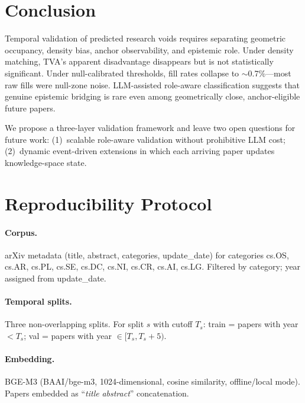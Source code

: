 \documentclass[11pt,twocolumn]{article}
\newcommand{\tva}{\textsf{TVA}}
\begin{document}
\section{Conclusion}

Temporal validation of predicted research voids requires separating geometric occupancy,
density bias, anchor observability, and epistemic role.
Under density matching, \tva{}'s apparent disadvantage disappears but is not
statistically significant. Under null-calibrated thresholds, fill rates collapse to
$\sim$0.7\%---most raw fills were null-zone noise.
LLM-assisted role-aware classification suggests that genuine epistemic bridging is rare even among
geometrically close, anchor-eligible future papers.

We propose a three-layer validation framework and leave two open questions for future
work: (1)~scalable role-aware validation without prohibitive LLM cost;
(2)~dynamic event-driven extensions in which each arriving paper updates knowledge-space
state.




\newpage
\appendix

\section{Reproducibility Protocol}
\label{app:protocol}

\paragraph{Corpus.}
arXiv metadata (title, abstract, categories, update\_date) for categories
cs.OS, cs.AR, cs.PL, cs.SE, cs.DC, cs.NI, cs.CR, cs.AI, cs.LG.
Filtered by category; year assigned from update\_date.

\paragraph{Temporal splits.}
Three non-overlapping splits. For split $s$ with cutoff $T_s$:
train = papers with year $< T_s$; val = papers with year $\in [T_s, T_s+5)$.

\paragraph{Embedding.}
BGE-M3 (BAAI/bge-m3, 1024-dimensional, cosine similarity, offline/local mode).
Papers embedded as ``\textit{title} \textit{abstract}'' concatenation.
\end{document}

